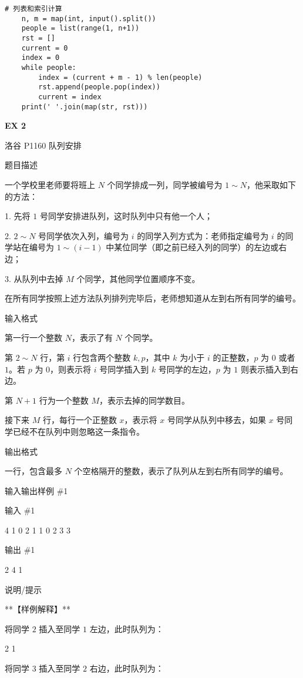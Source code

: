 \documentclass[../main]{subfiles}
\begin{document}
\begin{lstlisting}[style = Python]
    # 列表和索引计算
    n, m = map(int, input().split())
    people = list(range(1, n+1))
    rst = []
    current = 0
    index = 0
    while people:
        index = (current + m - 1) % len(people)
        rst.append(people.pop(index))
        current = index
    print(' '.join(map(str, rst)))
\end{lstlisting}

\textbf{EX 2}


洛谷 P1160 队列安排

题目描述

一个学校里老师要将班上 $N$ 个同学排成一列，同学被编号为 $1\sim N$，他采取如下的方法：

1. 先将 $1$ 号同学安排进队列，这时队列中只有他一个人；

2. $2\sim N$ 号同学依次入列，编号为 $i$ 的同学入列方式为：老师指定编号为 $i$ 的同学站在编号为 $1\sim(i-1)$ 中某位同学（即之前已经入列的同学）的左边或右边；

3. 从队列中去掉 $M$ 个同学，其他同学位置顺序不变。

在所有同学按照上述方法队列排列完毕后，老师想知道从左到右所有同学的编号。

输入格式

第一行一个整数 $N$，表示了有 $N$ 个同学。

第 $2\sim N$ 行，第 $i$ 行包含两个整数 $k,p$，其中 $k$ 为小于 $i$ 的正整数，$p$ 为 $0$ 或者 $1$。若 $p$ 为 $0$，则表示将 $i$ 号同学插入到 $k$ 号同学的左边，$p$ 为 $1$ 则表示插入到右边。

第 $N+1$ 行为一个整数 $M$，表示去掉的同学数目。

接下来 $M$ 行，每行一个正整数 $x$，表示将 $x$ 号同学从队列中移去，如果 $x$ 号同学已经不在队列中则忽略这一条指令。

输出格式

一行，包含最多 $N$ 个空格隔开的整数，表示了队列从左到右所有同学的编号。

输入输出样例 \#1

输入 \#1

4
1 0
2 1
1 0
2
3
3

输出 \#1

2 4 1

说明/提示

**【样例解释】**

将同学 $2$ 插入至同学 $1$ 左边，此时队列为：

2 1

将同学 $3$ 插入至同学 $2$ 右边，此时队列为：
\end{document}
